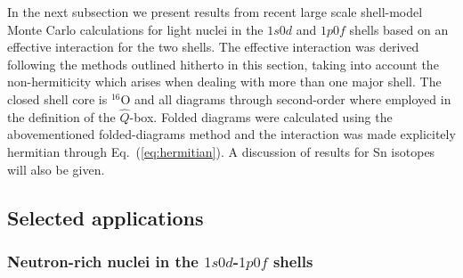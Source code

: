In the next subsection we present results from recent 
large scale shell-model Monte Carlo calculations \cite{drhklz99}
for light nuclei in the $1s0d$ and $1p0f$ shells based 
on an effective interaction for the two shells.
The effective interaction was derived following the methods
outlined hitherto in this section, taking into account 
the non-hermiticity which arises when dealing 
with more than one major shell.
The closed shell core is $^{16}$O and all diagrams through
second-order where employed in the definition of the
$\hat{Q}$-box. Folded diagrams were calculated using the abovementioned
folded-diagrams method and the interaction was made explicitely
hermitian through Eq.\ (\ref{eq:hermitian}). A discussion of results
for Sn isotopes will also be given.

\subsection{Selected applications}

\subsubsection{Neutron-rich nuclei in the $1s0d$-$1p0f$ shells}

